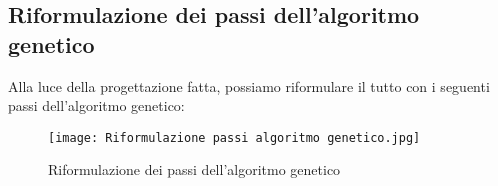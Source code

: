 \documentclass[10pt,a4paper]{article}
\begin{document}
    \subsection{Riformulazione dei passi dell'algoritmo genetico}
    \label{riformulazioneDeiPassiAlgoritmoGeneticoSubsection}
    Alla luce della progettazione fatta, possiamo riformulare il tutto con i seguenti passi 
    dell'algoritmo genetico: 
    \begin{figure}[h!]
      \centering
      \caption{Riformulazione dei passi dell'algoritmo genetico}
      \texttt{[image: Riformulazione passi algoritmo genetico.jpg]}
      \label{Riformulazione passi algoritmo genetico}
    \end{figure}
      
\end{document}
